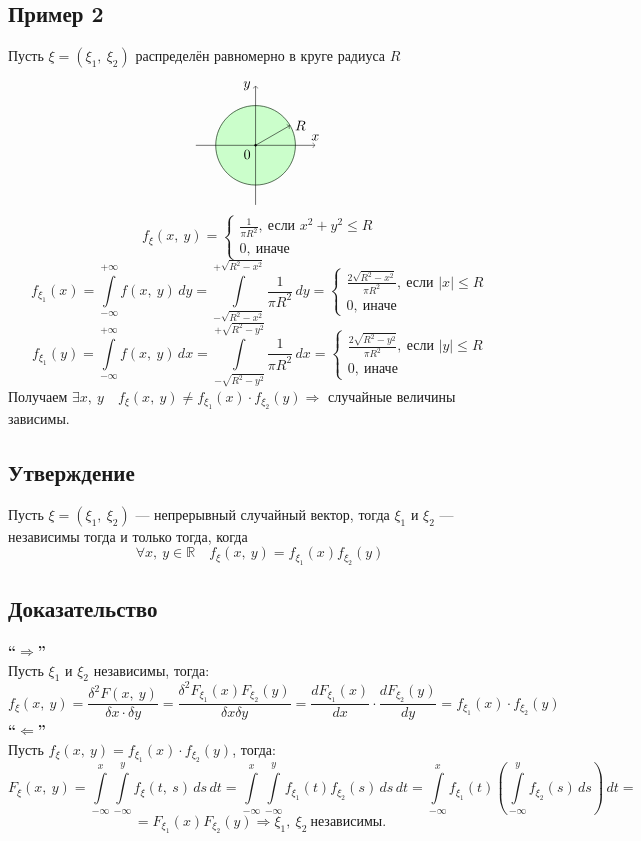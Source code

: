 \documentclass[12pt, a4paper]{article}
\begin{document}
    \subsection*{Пример 2}
    Пусть $\xi = (\xi_1,\ \xi_2)$ распределён равномерно в круге радиуса $R$
    \[\begin{tikzpicture}
        \filldraw[green, opacity=0.2] (0, 0) circle (1cm);
        \filldraw (0, 0) circle (0.25mm) node[anchor=north east]{0};
        \draw[->] (0, -1.5) -- (0, 1.5) node[anchor=east]{$y$};
        \draw[->] (-1.5, 0) -- (1.5, 0) node[anchor=south]{$x$};
        \draw (0, 0) circle (1cm);
        \draw[->] (0, 0) -- (0.866, 0.5) node[anchor=west]{$R$};
    \end{tikzpicture}\]
    \[f_{\xi}(x,\ y) = \begin{cases}
        \frac{1}{\pi R^2},\ \text{если } x^2 + y^2 \leq R\\
        0,\ \text{иначе}
    \end{cases}\]
    \[f_{\xi_1}(x) = \int\limits_{-\infty}^{+\infty} f(x,\ y)\, dy = \int\limits_{-\sqrt{R^2 - x^2}}^{+\sqrt{R^2 - x^2}} \frac{1}{\pi R^2}\, dy = \begin{cases}
        \frac{2\sqrt{R^2 - x^2}}{\pi R^2},\ \text{если } |x| \leq R\\
        0,\ \text{иначе}
    \end{cases}\]
    \[f_{\xi_1}(y) = \int\limits_{-\infty}^{+\infty} f(x,\ y)\, dx = \int\limits_{-\sqrt{R^2 - y^2}}^{+\sqrt{R^2 - y^2}} \frac{1}{\pi R^2}\, dx = \begin{cases}
        \frac{2\sqrt{R^2 - y^2}}{\pi R^2},\ \text{если } |y| \leq R\\
        0,\ \text{иначе}
    \end{cases}\]
    Получаем $\exists x,\ y\quad f_{\xi}(x,\ y) \neq f_{\xi_1}(x)\cdot f_{\xi_2}(y)\Rightarrow$ случайные величины зависимы.
    \subsection*{Утверждение}
    Пусть $\xi = (\xi_1,\ \xi_2)$ --- непрерывный случайный вектор, тогда $\xi_1$ и $\xi_2$ --- независимы тогда и только тогда, когда
    \[\forall x,\ y\in \mathbb{R}\quad f_{\xi}(x,\ y) = f_{\xi_1}(x) f_{\xi_2}(y)\]
    \subsection*{Доказательство}
    \textbf{``$\Rightarrow$''}\\
    Пусть $\xi_1$ и $\xi_2$ независимы, тогда:
    \[f_{\xi}(x,\ y) = \frac{\delta^2 F(x,\ y)}{\delta x \cdot \delta y} = \frac{\delta^2 F_{\xi_1}(x) F_{\xi_2} (y)}{\delta x \delta y} = \frac{dF_{\xi_1}(x)}{dx}\cdot \frac{dF_{\xi_2}(y)}{dy} = f_{\xi_1}(x)\cdot f_{\xi_2}(y)\]
    \textbf{``$\Leftarrow$''}\\
    Пусть $f_{\xi} (x,\ y) = f_{\xi_1}(x)\cdot f_{\xi_2}(y)$, тогда:
    \[F_{\xi}(x,\ y) = \int\limits_{-\infty}^{x}\int\limits_{-\infty}^{y}f_{\xi}(t,\ s)\, ds\, dt = \int\limits_{-\infty}^{x}\int\limits_{-\infty}^{y} f_{\xi_1}(t)f_{\xi_2}(s)\, ds\, dt = \int\limits_{-\infty}^{x} f_{\xi_1}(t) \left(\int\limits_{-\infty}^{y}f_{\xi_2}(s)\, ds\right)\, dt =\]
    \[= F_{\xi_1}(x) F_{\xi_2}(y)\Rightarrow \xi_1,\ \xi_2\ \text{независимы.}\]
\end{document}
